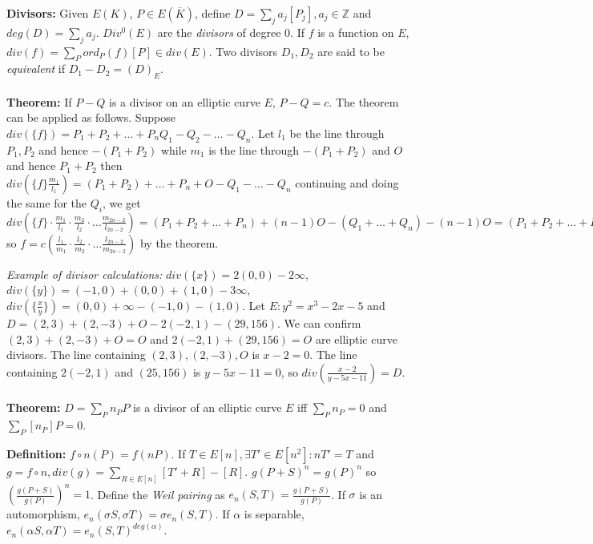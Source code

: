 {\bf Divisors:}
Given $E(K)$, $P \in E({\overline K})$, define $D= \sum_j a_j [P_j], a_j \in {\mathbb Z}$ and
$deg(D)= \sum_j a_j$.  $Div^0(E)$ are the \emph{divisors} of degree 0.  
If $f$ is a function on $E$,
$div(f) = \sum_P ord_P(f) [P] \in div(E)$.  Two divisors $D_1, D_2$ are said to be
\emph{equivalent} if $D_1-D_2 = (D)_E$.
\\
\\
{\bf Theorem:} If $P-Q$ is a divisor on an elliptic curve $E$, $P-Q= c$.
The theorem can be applied as follows.  Suppose
$div(\{ f \})= P_1 + P_2 + \ldots + P_n Q_1 - Q_2 - \ldots - Q_n$.  Let
$l_1$ be the line through $P_1, P_2$ and hence $-(P_1+P_2)$ while
$m_1$ is the line through $-(P_1+P_2)$ and $O$ and hence $P_1+P_2$ then
$div( \{f\} {\frac {m_1}{l_1}})= (P_1+P_2) + \ldots + P_n +O - Q_1 - \ldots - Q_n$ continuing
and doing the same for the $Q_i$, we get
$div( \{f\} \cdot
{\frac {m_1}{l_1}} \cdot
{\frac {m_2}{l_2}} \cdot \ldots
{\frac {m_{2n-2}}{l_{2n-2}}})=
(P_1+P_2 + \ldots + P_n) + (n-1) O - (Q_1 + \ldots + Q_n)
-(n-1)O =
(P_1+P_2 + \ldots + P_n) - (Q_1 + \ldots + Q_n)$ so 
$f=c ( {\frac {l_1}{m_1}} \cdot {\frac {l_2}{m_2}} \cdot \ldots
{\frac {l_{2n-2}}{m_{2n-2}}})$ by the theorem.
\begin{quote}
\end{quote}
\emph{Example of divisor calculations:}
$div(\{x \})= 2(0,0)-2 \infty$, 
$div(\{y \})= (-1,0)+(0,0)+(1,0) -3 \infty$, 
$div(\{ {\frac x y} \})= (0,0)+ \infty -(-1,0)-(1,0)$. 
Let $E: y^2= x^3 -2x -5$ and $D= (2,3)+(2,-3)+O-2(-2,1) -(29,156)$.  We
can confirm $(2,3) + (2, -3) +O= O$ and $2(-2,1)+(29, 156)= O$ are elliptic
curve divisors.  The line containing $(2,3), (2,-3),O$ is $x-2=0$.  The
line containing $2(-2,1)$ and $(25,156)$ is $y-5x-11=0$, so
$div({\frac {x-2} {y-5x-11}})= D$.
\\
\\
{\bf Theorem:}
$D= \sum_P n_P P$ is a divisor of an elliptic curve $E$ iff
$\sum_P n_P =0$ and $\sum_P [n_P]P =0$.
\begin{quote}
\end{quote}
{\bf Definition:}
$f \circ n (P)= f(nP)$.  If $T \in E[n], \exists T' \in E[n^2]: nT'=T$ and
$g=f \circ n, div(g)= \sum_{R \in E[n]} [T'+R] -[R]$.  $g(P+S)^n= g(P)^n$ so
$({\frac {g(P+S)} {g(P)}})^n=1$.  
Define the \emph{Weil pairing} as
$e_n(S,T)= {\frac {g(P+S)} {g(P)}}$.  If $\sigma$ is an automorphism, 
$e_n( \sigma S, \sigma T)= \sigma e_n(S,T)$.  If $\alpha$ is separable,
$e_n( \alpha S, \alpha T)= e_n(S,T)^{deg(\alpha)}$.  
\\
